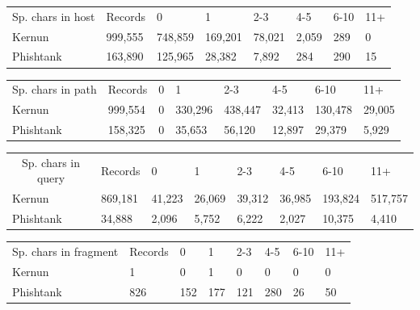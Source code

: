 \documentclass[
  digital, %
  oneside, %
  table,   %
  nolof,     %
  nolot,     %
]{fithesis3}
\begin{document}
\begin{table}[h!]
\begin{tabular}{llllllll}
\multicolumn{1}{c}{Sp. chars in host} & Records & 0       & 1       & 2-3    & 4-5   & 6-10 & 11+ \\
Kernun                                & 999,555 & 748,859 & 169,201 & 78,021 & 2,059 & 289  & 0   \\
Phishtank                             & 163,890 & 125,965 & 28,382  & 7,892  & 284   & 290  & 15 
\end{tabular}
\end{table}

\begin{table}[h!]
\begin{tabular}{llllllll}
\multicolumn{1}{c}{Sp. chars in path} & Records & 0 & 1       & 2-3     & 4-5    & 6-10    & 11+    \\
Kernun                                & 999,554 & 0 & 330,296 & 438,447 & 32,413 & 130,478 & 29,005 \\
Phishtank                             & 158,325 & 0 & 35,653  & 56,120  & 12,897 & 29,379  & 5,929 
\end{tabular}
\end{table}

\begin{table}[h!]
\begin{tabular}{llllllll}
\multicolumn{1}{c}{Sp. chars in query} & Records & 0      & 1      & 2-3    & 4-5    & 6-10    & 11+     \\
Kernun                                 & 869,181 & 41,223 & 26,069 & 39,312 & 36,985 & 193,824 & 517,757 \\
Phishtank                              & 34,888  & 2,096  & 5,752  & 6,222  & 2,027  & 10,375  & 4,410  
\end{tabular}
\end{table}

\begin{table}[h!]
\begin{tabular}{llllllll}
\multicolumn{1}{c}{Sp. chars in fragment} & Records & 0   & 1   & 2-3 & 4-5 & 6-10 & 11+ \\
Kernun                                    & 1       & 0   & 1   & 0   & 0   & 0    & 0   \\
Phishtank                                 & 826     & 152 & 177 & 121 & 280 & 26   & 50 
\end{tabular}
\end{table}
\end{document}
